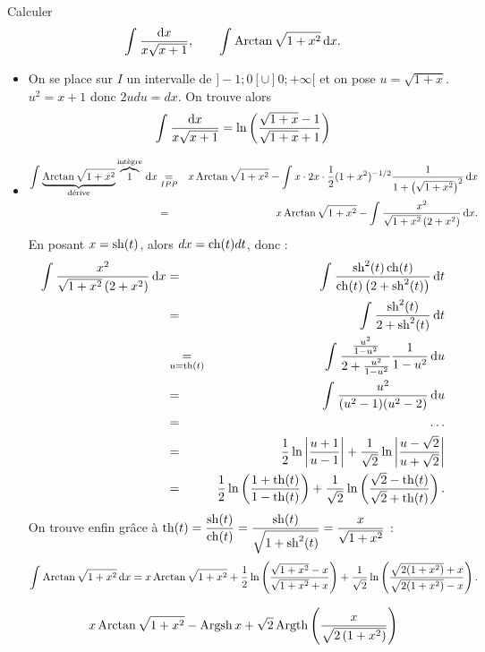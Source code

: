 \documentclass{magnolia}
\begin{document}
\begin{exoUnique}
\exo Calculer
  \[\priminv{x\sqrt{x+1}}{x}, \qquad \prim{\arctan\sqrt{1+x^2}}{x}.\]
  \begin{sol}
  \begin{itemize}
  \item On se place sur $I$ un intervalle de $]-1;0[\cup ]0;+\infty[$ et on pose $u=\sqrt{1+x}$. $u^2=x+1$ donc $2udu=dx$. On trouve alors
    \[\priminv{x\sqrt{x+1}}{x}=\ln\p{\frac{\sqrt{1+x}-1}{\sqrt{1+x}+1}}\]
  \item 
\begin{eqnarray*}
\primppdi{\arctan\sqrt{1+x^2}}{1}{x}&\underset{IPP}{=}&x\arctan\sqrt{1+x^2}-\prim{x\cdot 2x\cdot\frac{1}{2}(1+x^2)^{-1/2}\frac{1}{1+\p{\sqrt{1+x^2}}^2}}{x}\\
&=&x\arctan\sqrt{1+x^2}-\prim{\frac{x^2}{\sqrt{1+x^2}\p{2+x^2}}}{x}.
\end{eqnarray*}  
En posant $x=\sh(t)$, alors $dx=\ch(t)dt$, donc :
\begin{eqnarray*}
\prim{\frac{x^2}{\sqrt{1+x^2}\p{2+x^2}}}{x}&=&\prim{\frac{\sh^2(t)\ch(t)}{\ch(t)\p{2+\sh^2(t)}}}{t}\\
&=&\prim{\frac{\sh^2(t)}{2+\sh^2(t)}}{t}\\
&\underset{u=\th(t)}{=}&\prim{\frac{\frac{u^2}{1-u^2}}{2+\frac{u^2}{1-u^2}}\frac{1}{1-u^2}}{u}\\
&=&\prim{\frac{u^2}{(u^2-1)(u^2-2)}}{u}\\
&=&\ldots\\
&=& \frac{1}{2}\ln\abs{\frac{u+1}{u-1}}+\frac{1}{\sqrt{2}}\ln\abs{\frac{u-\sqrt{2}}{u+\sqrt{2}}}\\
&=&\frac{1}{2}\ln\p{\frac{1+\th(t)}{1-\th(t)}}+\frac{1}{\sqrt{2}}\ln\p{\frac{\sqrt{2}-\th(t)}{\sqrt{2}+\th(t)}}.
\end{eqnarray*}
  On trouve enfin grâce à $\th(t)=\dfrac{\sh(t)}{\ch(t)}=\dfrac{\sh(t)}{\sqrt{1+\sh^2(t)}}=\dfrac{x}{\sqrt{1+x^2}}$ :
$$\prim{\arctan\sqrt{1+x^2}}{x}=x\arctan\sqrt{1+x^2}+\frac{1}{2}\ln\p{\frac{\sqrt{1+x^2}-x}{\sqrt{1+x^2}+x}}+\frac{1}{\sqrt{2}}\ln\p{\frac{\sqrt{2(1+x^2)}+x}{\sqrt{2(1+x^2)}-x}}.$$
  
  
    \[x\arctan\sqrt{1+x^2}-\argsh x+
      \sqrt{2}\argth\p{\frac{x}{\sqrt{2\p{1+x^2}}}}\]
  \end{itemize}
  \end{sol}
\end{exoUnique}
\end{document}
